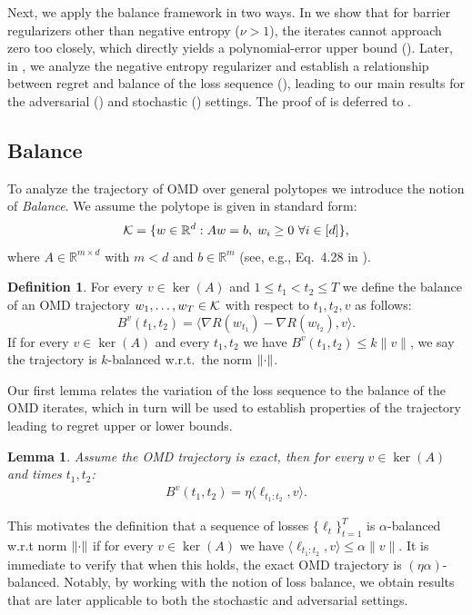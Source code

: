 \documentclass[10pt]{article}
\newtheorem{lemma}[theorem]{Lemma}
\theoremstyle{definition}
\newtheorem{definition}[theorem]{Definition}
\theoremstyle{remark}
\newcommand{\barconst}{\nu}
\begin{document}
Next, we apply the balance framework in two ways. In  we show that for barrier regularizers other than negative entropy ($\barconst > 1$), the iterates cannot approach zero too closely, which directly yields a polynomial-error upper bound (). Later, in , we analyze the negative entropy regularizer and establish 
a relationship between regret and balance of the loss sequence (), leading to our main results for the adversarial () and stochastic () settings. 
%
The proof of  is deferred to .

\subsection{Balance}\label{sec:balance}
To analyze the trajectory of OMD over general polytopes we introduce the notion of \emph{Balance}. 
We assume the polytope is given in standard form:
\[
    \mathcal K = \{ w \in \mathbb{R}^d : Aw = b, \; w_i \ge 0 \ \forall i \in [d] \},
\]
where $A \in \mathbb{R}^{m \times d}$ with $m<d$ and $b \in \mathbb{R}^m$ 
(see, e.g., Eq.\ 4.28 in \citealp{Boyd_Vandenberghe_2004}). 
\begin{definition}
For every $v \in \ker(A)$ and $1 \le t_1 < t_2 \le T$ we define the balance of an OMD trajectory $w_1, \ldots, w_T \in \mathcal K$ with respect to $t_1,t_2,v$ as follows:
\[
    B^v(t_1,t_2) = \langle \nabla R(w_{t_1}) - \nabla R(w_{t_2}), v \rangle.
\]
If for every $v \in \ker(A)$ and every $t_1,t_2$ we have $B^v(t_1,t_2) \le k \|v\|$, 
we say the trajectory is $k$-balanced w.r.t.~the norm $\norm{\cdot}$. 
\end{definition}

Our first lemma relates
 the variation of the loss sequence to the balance of the OMD iterates, which in turn will be used to establish properties of the trajectory leading to regret upper or lower bounds.
\begin{lemma}\label{lem:polytope balance}
Assume the OMD trajectory is exact, then for every $v\in \ker(A)$ and times $t_1,t_2$:
\begin{align*}
    B^v(t_1,t_2) = \eta \langle \ell_{t_1:t_2}, v \rangle
    .
\end{align*}
\end{lemma}

This motivates the definition that a sequence of losses $\{ \ell_t \}_{t=1}^T$ is $\alpha$-balanced w.r.t norm $\norm{\cdot}$ if for every $v \in \ker(A)$ we have 
$\langle \ell_{t_1:t_2}, v \rangle \le \alpha \|v\|$. 
It is immediate to verify that when 
 this holds, the exact OMD trajectory is $(\eta \alpha)$-balanced.
 Notably, by working with the notion of loss balance, we obtain results that are later applicable to both the stochastic and adversarial settings.
\end{document}
